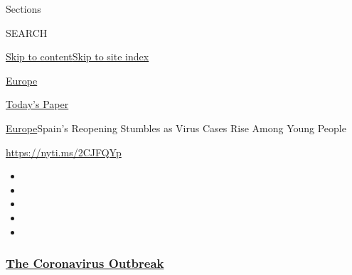 Sections

SEARCH

\protect\hyperlink{site-content}{Skip to
content}\protect\hyperlink{site-index}{Skip to site index}

\href{https://www.nytimes3xbfgragh.onion/section/world/europe}{Europe}

\href{https://myaccount.nytimes3xbfgragh.onion/auth/login?response_type=cookie\&client_id=vi}{}

\href{https://www.nytimes3xbfgragh.onion/section/todayspaper}{Today's
Paper}

\href{/section/world/europe}{Europe}\textbar{}Spain's Reopening Stumbles
as Virus Cases Rise Among Young People

\url{https://nyti.ms/2CJFQYp}

\begin{itemize}
\item
\item
\item
\item
\item
\end{itemize}

\hypertarget{the-coronavirus-outbreak}{%
\subsubsection{\texorpdfstring{\href{https://www.nytimes3xbfgragh.onion/news-event/coronavirus?name=styln-coronavirus-national\&region=TOP_BANNER\&variant=undefined\&block=storyline_menu_recirc\&action=click\&pgtype=Article\&impression_id=1bd9d2e0-e3b4-11ea-86f8-efc84775e6d4}{The
Coronavirus
Outbreak}}{The Coronavirus Outbreak}}\label{the-coronavirus-outbreak}}


